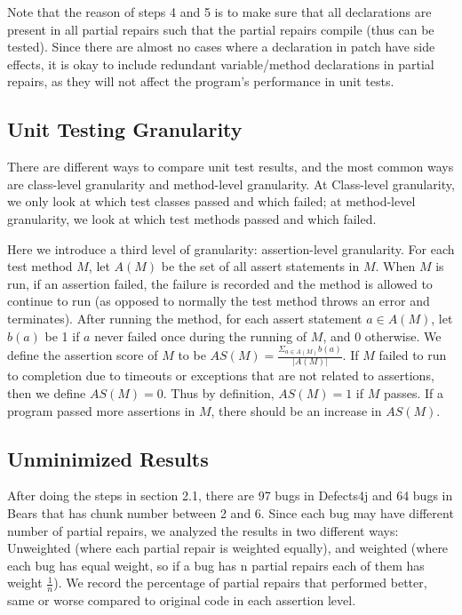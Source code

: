\documentclass[sigconf, timestamp-false, anonymous=true]{acmart}
\begin{document}
Note that the reason of steps 4 and 5 is to make sure that all declarations are 
present in all partial repairs such that the partial repairs compile (thus can be 
tested). Since there are almost no cases where a declaration in patch have side 
effects, it is okay to include redundant variable/method declarations in partial 
repairs, as they will not affect the program's performance in unit tests. 

\subsection{Unit Testing Granularity}

There are different ways to compare unit test results, and the most common ways 
are class-level granularity and method-level granularity. At Class-level granularity, 
we only look at which test classes passed and which failed; at method-level 
granularity, we look at which test methods passed and which failed.

Here we introduce a third level of granularity: assertion-level granularity. 
For each test method $M$, let $A(M)$ be the set of all assert statements in $M$. 
When $M$ is run, if an assertion failed, the failure is recorded and the method 
is allowed to continue to run (as opposed to normally the test method throws an 
error and terminates). After running the method, for each assert statement 
$a\in A(M)$, let $b(a)$ be 1 if $a$ never failed once during the running of $M$, 
and 0 otherwise. We define the assertion score of $M$ to be 
$AS(M)=\frac{\Sigma_{a\in A(M)}b(a)}{|A(M)|}$. If $M$ failed to run to completion 
due to timeouts or exceptions that are not related to assertions, then we define 
$AS(M)=0$. Thus by definition, $AS(M)=1$ if $M$ passes. If a program passed more 
assertions in $M$, there should be an increase in $AS(M)$.


\subsection{Unminimized Results}

After doing the steps in section 2.1, there are 97 bugs in Defects4j and 64 bugs 
in Bears that has chunk number between 2 and 6. Since each bug may have different 
number of partial repairs, we analyzed the results in two different ways: 
Unweighted (where each partial repair is weighted equally), and weighted (where each bug 
has equal weight, so if a bug has n partial repairs each of them has weight 
$\frac{1}{n}$). We record the percentage of partial repairs that performed better, same
or worse compared to original code in each assertion level.
\end{document}
